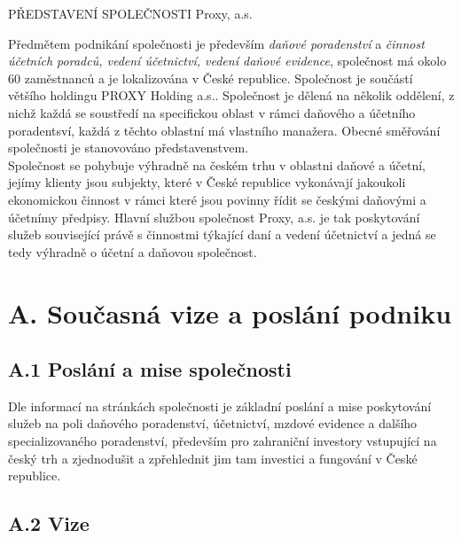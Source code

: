 \maketitle
\thispagestyle{fancy}

\begin{lefttextpipe}
	{\huge PŘEDSTAVENÍ SPOLEČNOSTI Proxy, a.s.}
\end{lefttextpipe}

Předmětem podnikání společnosti je především \textit{daňové poradenství} a \textit{činnost účetních poradců, vedení účetnictví, vedení daňové evidence}, společnost má okolo 60 zaměstnanců a je lokalizována v České republice. Společnost je součástí většího holdingu PROXY Holding a.s.. Společnost je dělená na několik oddělení, z nichž každá se soustředí na specifickou oblast v rámci daňového a účetního poradentsví, každá z těchto oblastní má vlastního manažera. Obecné směřování společnosti je stanovováno představenstvem.\\

Společnost se pohybuje výhradně na českém trhu v oblastni daňové a účetní, jejímy klienty jsou subjekty, které v České republice vykonávají jakoukoli ekonomickou činnost v rámci které jsou povinny řídit se českými daňovými a účetnímy předpisy. Hlavní službou společnost Proxy, a.s. je tak poskytování služeb související právě s činnostmi týkající daní a vedení účetnictví a jedná se tedy výhradně o účetní a daňovou společnost.

\section*{A. Současná vize a poslání podniku}

\subsection*{A.1 Poslání a mise společnosti}

Dle informací na stránkách společnosti je základní poslání a mise poskytování služeb na poli daňového poradenství, účetnictví, mzdové evidence a dalšího specializovaného poradenství\footfullcite{}, především pro zahraniční investory vstupující na český trh a zjednodušit a zpřehlednit jim tam investici a fungování v České republice. 

\subsection*{A.2 Vize}

